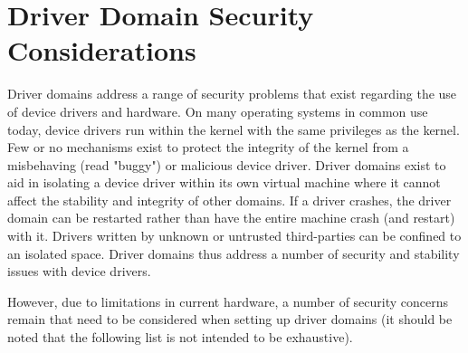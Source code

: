 \documentclass[11pt,twoside,final,openright]{report}
\begin{document}
\section{Driver Domain Security Considerations}
\label{s:ddsecurity}

Driver domains address a range of security problems that exist regarding
the use of device drivers and hardware. On many operating systems in common
use today, device drivers run within the kernel with the same privileges as
the kernel. Few or no mechanisms exist to protect the integrity of the kernel
from a misbehaving (read "buggy") or malicious device driver. Driver
domains exist to aid in isolating a device driver within its own virtual
machine where it cannot affect the stability and integrity of other
domains. If a driver crashes, the driver domain can be restarted rather than
have the entire machine crash (and restart) with it. Drivers written by
unknown or untrusted third-parties can be confined to an isolated space.
Driver domains thus address a number of security and stability issues with
device drivers.

However, due to limitations in current hardware, a number of security
concerns remain that need to be considered when setting up driver domains (it
should be noted that the following list is not intended to be exhaustive).
\end{document}
